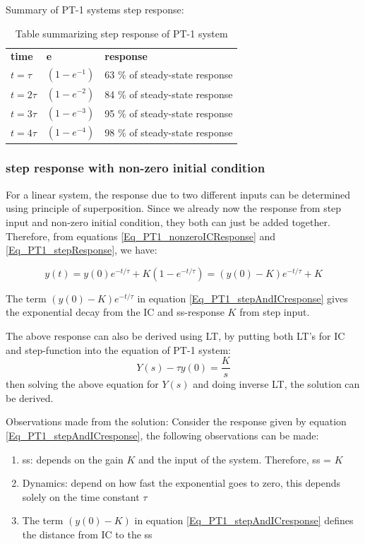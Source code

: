 Summary of PT-1 systems step response:

\begin{table}[h!]
	\centering
	\begin{tabular}{m{2cm} m{2cm} m{4cm}}
		\toprule
		\textbf{time} & \textbf{e} & \textbf{response} \\
		\cmidrule{1-3}
		$t = \tau$ & $(1 - e^{-1})$ & 63 $\%$ of steady-state response \\
		$t = 2 \tau$ & $(1 - e^{-2})$ & 84 $\%$ of steady-state response \\
		$t = 3 \tau$ & $(1 - e^{-3})$ & 95 $\%$ of steady-state response \\
		$t = 4 \tau$ & $(1 - e^{-4})$ & 98 $\%$ of steady-state response \\
		\bottomrule
	\end{tabular}
	\caption{Table summarizing step response of PT-1 system}
\end{table}

\subsubsection{step response with non-zero initial condition}

For a linear system, the response due to two different inputs can be determined using principle of superposition. Since we already now the response from step input and non-zero initial condition, they both can just be added together. Therefore, from equations \eqref{Eq_PT1_nonzeroICResponse} and \eqref{Eq_PT1_stepResponse}, we have:

\begin{equation} \label{Eq_PT1_stepAndICresponse}
	y(t) = y(0) e^{-t/\tau} + K (1 - e^{-t/\tau}) = (y(0) - K) e^{-t/\tau} + K
\end{equation}

The term $(y(0) - K) e^{-t/\tau}$ in equation \eqref{Eq_PT1_stepAndICresponse} gives the exponential decay from the IC and ss-response $K$ from step input.

The above response can also be derived using LT, by putting both LT's for IC and step-function into the equation of PT-1 system:
\begin{equation}
	[s \tau + 1] Y(s) - \tau y(0) = \frac{K}{s}
\end{equation}
then solving the above equation for $Y(s)$ and doing inverse LT, the solution can be derived.

Observations made from the solution: Consider the response given by equation \eqref{Eq_PT1_stepAndICresponse}, the following observations can be made:
\begin{enumerate}
	\item ss: depends on the gain $K$ and the input of the system. Therefore, ss = $K$
	\item Dynamics: depend on how fast the exponential goes to zero, this depends solely on the time constant $\tau$
	\item The term $(y(0) - K)$ in equation \eqref{Eq_PT1_stepAndICresponse} defines the distance from IC to the ss
\end{enumerate}

